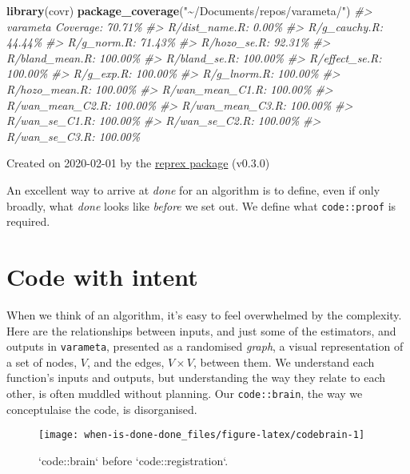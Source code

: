 \documentclass[
]{article}
\newenvironment{Shaded}{\begin{snugshade}}{\end{snugshade}}
\newcommand{\CommentTok}[1]{\textcolor[rgb]{0.56,0.35,0.01}{\textit{#1}}}
\newcommand{\KeywordTok}[1]{\textcolor[rgb]{0.13,0.29,0.53}{\textbf{#1}}}
\newcommand{\NormalTok}[1]{#1}
\newcommand{\StringTok}[1]{\textcolor[rgb]{0.31,0.60,0.02}{#1}}
\begin{document}
\begin{Shaded}
\begin{Highlighting}[]
\KeywordTok{library}\NormalTok{(covr)}
\KeywordTok{package\_coverage}\NormalTok{(}\StringTok{"\textasciitilde{}/Documents/repos/varameta/"}\NormalTok{)}
\CommentTok{\#> varameta Coverage: 70.71\%}
\CommentTok{\#> R/dist\_name.R: 0.00\%}
\CommentTok{\#> R/g\_cauchy.R: 44.44\%}
\CommentTok{\#> R/g\_norm.R: 71.43\%}
\CommentTok{\#> R/hozo\_se.R: 92.31\%}
\CommentTok{\#> R/bland\_mean.R: 100.00\%}
\CommentTok{\#> R/bland\_se.R: 100.00\%}
\CommentTok{\#> R/effect\_se.R: 100.00\%}
\CommentTok{\#> R/g\_exp.R: 100.00\%}
\CommentTok{\#> R/g\_lnorm.R: 100.00\%}
\CommentTok{\#> R/hozo\_mean.R: 100.00\%}
\CommentTok{\#> R/wan\_mean\_C1.R: 100.00\%}
\CommentTok{\#> R/wan\_mean\_C2.R: 100.00\%}
\CommentTok{\#> R/wan\_mean\_C3.R: 100.00\%}
\CommentTok{\#> R/wan\_se\_C1.R: 100.00\%}
\CommentTok{\#> R/wan\_se\_C2.R: 100.00\%}
\CommentTok{\#> R/wan\_se\_C3.R: 100.00\%}
\end{Highlighting}
\end{Shaded}

Created on 2020-02-01 by the \href{https://reprex.tidyverse.org}{reprex
package} (v0.3.0)

An excellent way to arrive at \emph{done} for an algorithm is to define,
even if only broadly, what \emph{done} looks like \emph{before} we set
out. We define what \texttt{code::proof} is required.

\hypertarget{code-with-intent}{%
\section{Code with intent}\label{code-with-intent}}

When we think of an algorithm, it's easy to feel overwhelmed by the
complexity. Here are the relationships between inputs, and just some of
the estimators, and outputs in \texttt{varameta}, presented as a
randomised \emph{graph}, a visual representation of a set of nodes,
\(V\), and the edges, \(V \times V\), between them. We understand each
function's inputs and outputs, but understanding the way they relate to
each other, is often muddled without planning. Our \texttt{code::brain},
the way we conceptulaise the code, is disorganised.

\begin{figure}

{\centering \texttt{[image: when-is-done-done\_files/figure-latex/codebrain-1]} 

}

\caption{`code::brain` before `code::registration`.}\label{fig:codebrain}
\end{figure}
\end{document}
